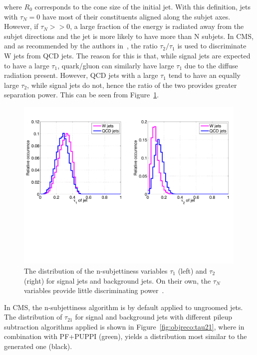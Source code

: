 where $R_0$ corresponds to the cone size of the initial jet. With this definition, jets with $\tau_N=0$ have most of their constituents aligned along the subjet axes. However, if $\tau_N>>0$, a large fraction of the energy is radiated away from the subjet directions and the jet is more likely to have more than N subjets.
In CMS, and as recommended by the authors in~\cite{Thaler:2010tr}, the ratio $\tau_2/\tau_1$ is used to discriminate W jets from QCD jets. The reason for this is that, while signal jets are expected to have a large $\tau_1$, quark/gluon can similarly have large $\tau_1$ due to the diffuse radiation present. However, QCD jets with a large $\tau_1$ tend to have an equally large $\tau_2$, while signal jets do not, hence the ratio of the two provides greater separation power. This can be seen from Figure~\ref{fig:objreco:tau2tau1}.
\begin{figure}[h!] 
    \centering 
    \includegraphics[width=0.990\textwidth]{figures/event_reconstruction/tau1tau2.pdf}
     \caption{The distribution of the n-subjettiness variables $\tau_{1}$ (left) and $\tau_{2}$ (right) for signal jets and background jets. On their own, the $\tau_N$ variables provide little discriminating power~\cite{Thaler:2010tr}.}
     \label{fig:objreco:tau2tau1}
 \end{figure}
 In CMS, the n-subjettiness algorithm is by default applied to ungroomed jets.
The distribution of $\tau_{21}$ for signal and background jets with different pileup subtraction algorithms applied is shown in Figure~\ref{fig:objreco:tau21}, where \nsubj in combination with PF+PUPPI (green), yields a distribution most similar to the generated one (black).
